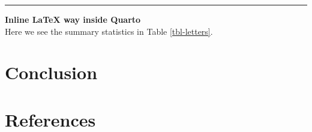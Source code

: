 \documentclass[
  12pt,
  a4paper,
  openany]{scrbook}
\begin{document}
\begin{center}\rule{0.5\linewidth}{0.5pt}\end{center}

\textbf{Inline LaTeX way inside Quarto}\\
Here we see the summary statistics in Table \ref{tbl-letters}.


\chapter{Conclusion}\label{conclusion}


\chapter*{References}\label{references}

\end{document}
